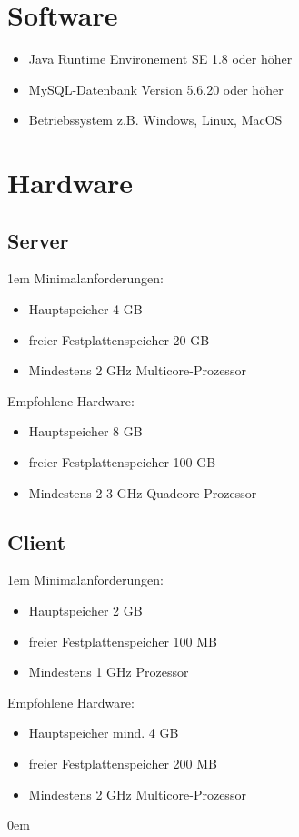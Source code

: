 \section{Software}
   \begin{itemize}
      \item Java Runtime Environement SE 1.8 oder höher
      \item MySQL-Datenbank Version 5.6.20 oder höher
      \item Betriebssystem z.B. Windows, Linux, MacOS
   \end{itemize}
\section{Hardware}
\label{sec:empfohleneHardware}
   \subsection{Server}
   \leftskip1em
	Minimalanforderungen:
   \begin{itemize}
   	\leftskip1em
      \item Hauptspeicher 4 GB
      \item freier Festplattenspeicher 20 GB
      \item Mindestens 2 GHz Multicore-Prozessor
   \end{itemize}
   Empfohlene Hardware:
   \begin{itemize}
   \leftskip1em
      \item Hauptspeicher 8 GB
      \item freier Festplattenspeicher 100 GB
      \item Mindestens 2-3 GHz Quadcore-Prozessor
   \end{itemize}
   \subsection{Client}\label{subsec:speicherClient}
   \leftskip1em
   	Minimalanforderungen:
   \begin{itemize}
   \leftskip1em
      \item Hauptspeicher 2 GB
      \item freier Festplattenspeicher 100 MB
      \item Mindestens 1 GHz Prozessor
   \end{itemize}
   Empfohlene Hardware:
   \begin{itemize}
   \leftskip1em
      \item Hauptspeicher mind. 4 GB
      \item freier Festplattenspeicher 200 MB
      \item Mindestens 2 GHz Multicore-Prozessor
   \end{itemize}
   \rightskip0em
